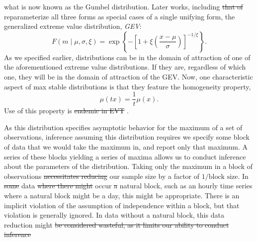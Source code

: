   what is now known as the Gumbel distribution.  Later works, including \st{that of}  \cite{jenkinson1955} reparameterize all three forms as special cases of a single unifying
  form, the generalized extreme value distribution, \emph{GEV}:
  \begin{equation*}
    \label{eqn:gev}
    F(m \mid \mu, \sigma, \xi) = \exp\left\lbrace-\left[1 + \xi\left(\frac{x - \mu}{\sigma}\right)\right]^{-1/{\xi}}\right\rbrace.
  \end{equation*}
  As we specified earlier, distributions can be in the domain of attraction of one of the
  aforementioned extreme value distributions.  If they are, regardless of which one, they will be in
  the domain of attraction of the GEV.  Now, one characteristic aspect of max stable distributions
  is that they feature the homogeneity property,
  \begin{equation*}
    \mu(tx) = \frac{1}{t}\mu(x).
  \end{equation*}
  Use of this property is \st{endemic in EVT} .

As this distribution specifies asymptotic behavior for the maximum of a set of observations,
  inference assuming this distribution requires we specify some block of data that we would take the
  maximum in, and report only that maximum.  A series of these blocks yielding a series of maxima
  allows us to conduct inference about the parameters of the distribution.  Taking only the maximum
  in a block of observations \st{necessitates reducing}  our sample size by a factor of $1/\text{block size}$.
  In \st{some}  data \st{where there might} occur \st{a} natural block, such as an hourly time series where a natural
  block might be a day, this might be appropriate.  There is an implicit violation of the assumption
  of independence within a block, but that violation is generally ignored.  In data without a natural
  block, this data reduction might \st{be considered wasteful, as it limits our ability to conduct inference} 

